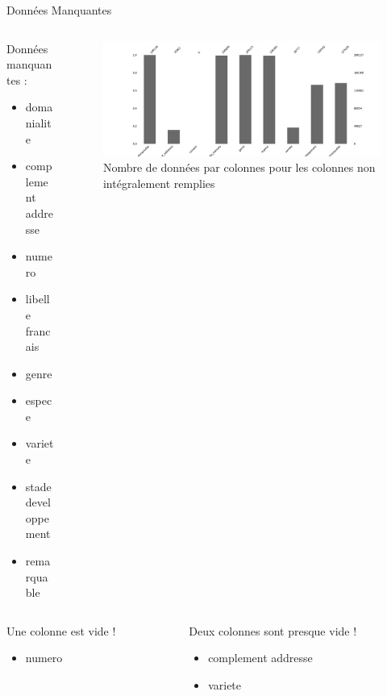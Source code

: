 \documentclass{beamer}
\begin{document}
\begin{frame}{Données Manquantes}
	\begin{columns}
	\begin{column}{0.2\textwidth}
		\tiny
		Données manquantes :
		\begin{itemize}
			\item domanialite
			\item complement addresse
			\item numero
			\item libelle francais
			\item genre
			\item espece
			\item variete
			\item stade developpement
			\item remarquable
		\end{itemize}
	\end{column}
	\begin{column}{0.9\textwidth}
		\begin{figure}
		\centering
		\includegraphics[width=\textwidth,keepaspectratio]{ressources/missingno2.png}
			\caption{Nombre de données par colonnes pour les colonnes non intégralement remplies}
		\end{figure}
	\end{column}
	\end{columns}
	\begin{columns}
	\begin{column}{0.4\textwidth}
		\begin{alertblock}{Une colonne est vide !}
			\begin{itemize}
				\item numero
			\end{itemize}
		\end{alertblock}
	\end{column}
	\begin{column}{0.6\textwidth}
		\begin{alertblock}{Deux colonnes sont presque vide !}
			\begin{itemize}
				\item complement addresse
				\item variete
			\end{itemize}
		\end{alertblock}
	\end{column}
	\end{columns}
\end{frame}
\end{document}
